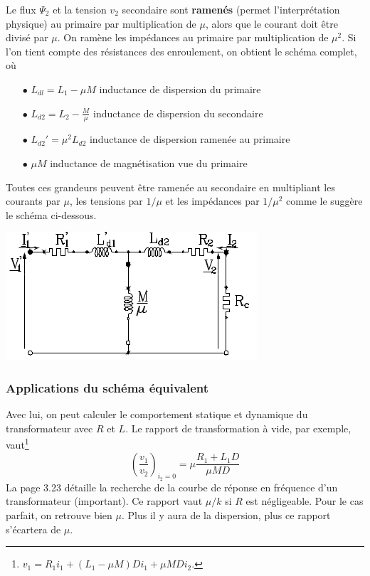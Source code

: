 		Le flux $\Psi_2$ et la tension $v_2$ secondaire sont \textbf{ramenés} (permet 
		l'interprétation physique) au primaire 
		par multiplication de $\mu$, alors que le courant doit être divisé par $
		\mu$. On ramène les impédances au primaire par multiplication de $\mu^2$.
		Si l'on tient compte des résistances des enroulement, on obtient le schéma 
		complet, où
		\begin{itemize}
		\item[$\bullet$] $L_{dl} = L_1-\mu M$ inductance de dispersion du primaire
		\item[$\bullet$] $L_{d2} = L_2-\frac{M}{\mu}$ inductance de dispersion du 
		secondaire
		\item[$\bullet$] $L_{d2}' = \mu^2L_{d2}$ inductance de dispersion ramenée au 
		primaire
		\item[$\bullet$] $\mu M$ inductance de magnétisation vue du primaire
		\end{itemize}
		Toutes ces grandeurs peuvent être ramenée au secondaire en multipliant les
		courants par $\mu$, les tensions par $1/\mu$ et les impédances par $1/\mu^2$ 
		comme le suggère le schéma ci-dessous.
		\begin{center}
		\includegraphics[scale=0.57]{ch3/image11.png}
		\end{center}
		
		
		\subsubsection{Applications du schéma équivalent}
		Avec lui, on peut calculer le comportement statique et dynamique du 
		transformateur avec $R$ et $L$. Le rapport de transformation à vide, par 
		exemple, vaut\footnote{$v_1 = R_1i_1 + (L_1-\mu M)Di_1 + \mu MDi_2$.}
		\begin{equation}
		\left(\dfrac{v_1}{v_2}\right)_{i_2=0} = \mu\dfrac{R_1+L_1D}{\mu MD}
		\end{equation}
		La page 3.23 détaille la recherche de la courbe de réponse en fréquence 
		d'un transformateur (important). Ce rapport vaut $\mu/k$ si $R$ est 
		négligeable. Pour le cas parfait, on retrouve bien $\mu$. Plus il y 
		aura de la dispersion, plus ce rapport s'écartera de $\mu$.
		
